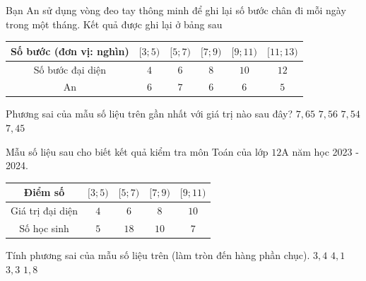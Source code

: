 \begin{ex}%
	Bạn An sử dụng vòng đeo tay thông minh để ghi lại số bước chân đi mỗi ngày trong một tháng. Kết quả được ghi lại ở bảng sau
	\begin{center}
	\begin{tabular}{|c|c|c|c|c|c|}
		\hline Số bước (đơn vị: nghìn) &{$[3;5)$} &{$[5;7)$} &{$[7;9)$} &{$[9;11)$} &{$[11;13)$} \\
		\hline Số bước đại diện & $ 4 $ & $ 6 $ & $ 8 $ & $ 10 $ & $ 12 $ \\
		\hline An & $ 6 $ & $ 7 $ & $ 6 $ & $ 6 $ & $ 5 $ \\
		\hline
	\end{tabular}
\end{center}	
	Phương sai của mẫu số liệu trên gần nhất với giá trị nào sau đây?
	\choice
	{$ 7{,}65 $}
	{\True $ 7{,}56 $}
	{$ 7{,}54 $}
	{$ 7{,}45 $}
\end{ex}
\begin{ex}%
	Mẫu số liệu sau cho biết kết quả kiểm tra môn Toán của lớp $12$A năm học 2023 - 2024.
	\begin{center}
		\begin{tabular}{|c|c|c|c|c|}
			\hline
			Điểm số & $[3;5)$&$[5;7)$&$[7;9)$&$[9;11)$\\
			\hline
			Giá trị đại diện & $4$&$6$&$8$&$10$\\
			\hline
			Số học sinh &$5$&$18$&$10$&$7$\\
			\hline
		\end{tabular}
	\end{center}
Tính phương sai của mẫu số liệu trên (làm tròn đến hàng phần chục).
\choice
{\True $ 3{,}4 $}
{$ 4{,}1 $}
{$ 3{,}3 $}
{$ 1{,}8 $}
\end{ex}
